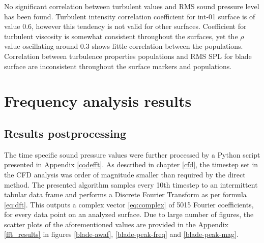 No significant correlation between turbulent values and RMS sound pressure level has been found. Turbulent intensity correlation coefficient for int-01 surface is of value 0.6, however this tendency is not valid for other surfaces. Coefficient for turbulent viscosity is somewhat consistent throughout the surfaces, yet the $\rho$ value oscillating around 0.3 shows little correlation between the populations. Correlation between turbulence properties populations and RMS SPL for blade surface are inconsistent throughout the surface markers and populations.


\section{Frequency analysis results} \label{fft}

\subsection{Results postprocessing} \label{fft_res_prep}
The time specific sound pressure values were further processed by a Python script presented in Appendix \ref{codefft}. As described in chapter \ref{cfd}, the timestep set in the CFD analysis was order of magnitude smaller than required by the direct method. The presented algorithm samples every 10th timestep to an intermittent tabular data frame and performs a Discrete Fourier Transform as per formula \ref{eq:dft}. This outputs a complex vector \ref{eq:complex} of 5015 Fourier coefficients, for every data point on an analyzed surface. Due to large number of figures, the scatter plots of the aforementioned values are provided in the Appendix \ref{fft_results} in figures \ref{blade-awaf}, \ref{blade-peak-freq} and \ref{blade-peak-mag}.


